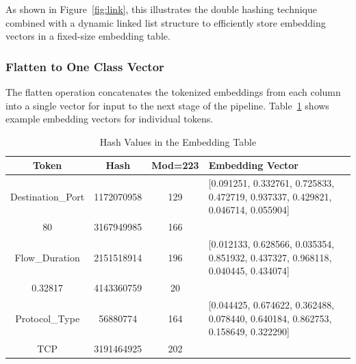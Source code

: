 \begin{ZhChapter}
    As shown in Figure~\ref{fig:link}, this illustrates the double hashing technique combined with a dynamic linked list structure to efficiently store embedding vectors in a fixed-size embedding table.







    \subsubsection{Flatten to One Class Vector}
    The flatten operation concatenates the tokenized embeddings from each column into a single vector for input to the next stage of the pipeline. Table~\ref{tab:token_embedding_table} shows example embedding vectors for individual tokens.


    \begin{table}[htbp]
        \scriptsize
        \centering
        \renewcommand{\arraystretch}{1.2}
        \caption{Hash Values in the Embedding Table}
        \vspace{1em}
        \begin{tabular}{| c | c | c | l |}
            \hline
            \textbf{Token}    & \textbf{Hash} & \textbf{Mod=223} & \textbf{Embedding Vector}                                                        \\
            \hline
            Destination\_Port & 1172070958    & 129              & [0.091251, 0.332761, 0.725833, 0.472719, 0.937337, 0.429821, 0.046714, 0.055904] \\
            80                & 3167949985    & 166              &                                                                                  \\
            \hline
            Flow\_Duration    & 2151518914    & 196              & [0.012133, 0.628566, 0.035354, 0.851932, 0.437327, 0.968118, 0.040445, 0.434074] \\
            0.32817           & 4143360759    & 20               &                                                                                  \\
            \hline
            Protocol\_Type    & 56880774      & 164              & [0.044425, 0.674622, 0.362488, 0.078440, 0.640184, 0.862753, 0.158649, 0.322290] \\
            TCP               & 3191464925    & 202              &                                                                                  \\
            \hline
        \end{tabular}
        \label{tab:token_embedding_table}
    \end{table}




\end{ZhChapter}
